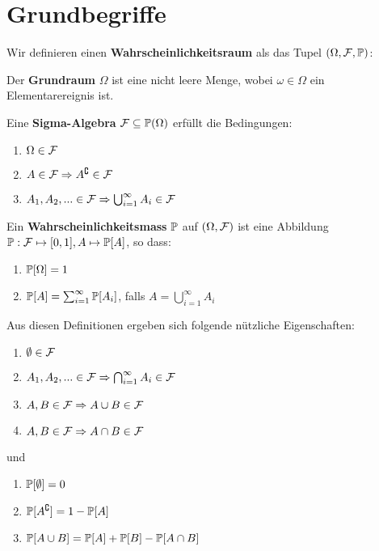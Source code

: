 \section{Grundbegriffe}

Wir definieren einen \textbf{Wahrscheinlichkeitsraum} als das Tupel $(\Omega, \mathcal{F}, \mathbb{P})$:

\begin{mainbox}{}
    Der \textbf{Grundraum} $\Omega$ ist eine nicht leere Menge, wobei $\omega \in \Omega$ ein Elementarereignis ist. \medskip
    
    Eine \textbf{Sigma-Algebra} $\mathcal{F} \subseteq \mathbb{P}(\Omega)$ erfüllt die Bedingungen:
    \begin{enumerate}
        \item $\Omega \in \mathcal{F}$
        \item $A \in \mathcal{F} \Rightarrow A^\complement \in \mathcal{F}$
        \item $A_1, A_2, ... \in \mathcal{F} \Rightarrow \bigcup^\infty_{i = 1} A_i \in \mathcal{F}$
    \end{enumerate} \medskip
    
    Ein \textbf{Wahrscheinlichkeitsmass} $\mathbb{P}$ auf $(\Omega, \mathcal{F})$ ist eine Abbildung $\mathbb{P} : \mathcal{F} \mapsto [0,1], A \mapsto \mathbb{P}[A]$, so dass:
    \begin{enumerate}
        \item $\mathbb{P}[\Omega] = 1$
        \item $\mathbb{P}[A] = \sum_{i=1}^\infty \mathbb{P}[A_i]$, falls $A = \bigcup_{i = 1}^\infty A_i$
    \end{enumerate}
\end{mainbox}

Aus diesen Definitionen ergeben sich folgende nützliche Eigenschaften:
\begin{subbox}{}
\begin{enumerate}
    \item $\emptyset \in \mathcal{F}$
    \item $A_1, A_2, ... \in \mathcal{F} \Rightarrow \bigcap_{i = 1}^\infty A_i \in \mathcal{F}$
    \item $A, B \in \mathcal{F} \Rightarrow A \cup B \in \mathcal{F}$
    \item $A, B \in \mathcal{F} \Rightarrow A \cap B \in \mathcal{F}$
\end{enumerate}
\end{subbox}
und
\begin{subbox}{}
\begin{enumerate}
    \item $\mathbb{P}[\emptyset] = 0$
    \item $\mathbb{P}[A^\complement] = 1 - \mathbb{P}[A]$
    \item $\mathbb{P}[A \cup B] = \mathbb{P}[A] + \mathbb{P}[B] - \mathbb{P}[A \cap B]$
\end{enumerate}
\end{subbox}

